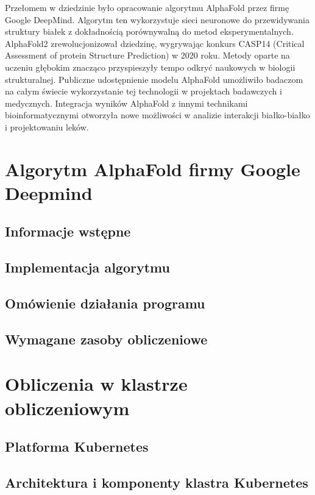 Przełomem w dziedzinie było opracowanie algorytmu AlphaFold przez firmę Google DeepMind.
Algorytm ten wykorzystuje sieci neuronowe do przewidywania struktury białek z dokładnością porównywalną do metod eksperymentalnych.
AlphaFold2 zrewolucjonizował dziedzinę, wygrywając konkurs CASP14 (Critical Assessment of protein Structure Prediction) w 2020 roku.
Metody oparte na uczeniu głębokim znacząco przyspieszyły tempo odkryć naukowych w biologii strukturalnej.
Publiczne udostępnienie modelu AlphaFold umożliwiło badaczom na całym świecie wykorzystanie tej technologii w projektach badawczych i medycznych.
Integracja wyników AlphaFold z innymi technikami bioinformatycznymi otworzyła nowe możliwości w analizie interakcji białko-białko i projektowaniu leków.


\section{Algorytm AlphaFold firmy Google Deepmind}

\subsection{Informacje wstępne}

\subsection{Implementacja algorytmu}

\subsection{Omówienie działania programu}

\subsection{Wymagane zasoby obliczeniowe}


\section{Obliczenia w klastrze obliczeniowym}

\subsection{Platforma Kubernetes}

\subsection{Architektura i komponenty klastra Kubernetes}

